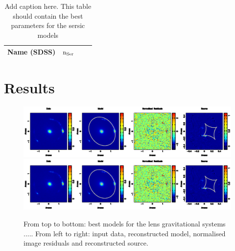 \documentclass[a4paper,fleqn,usenatbib]{mnras}
\begin{document}
\begin{table}
\caption{Add caption here. This table should contain the best parameters for the sersic models}
\begin{tabular}{cccc}
\hline
 Name (SDSS) &$\rm{n_{Ser}}$\\
 \hline

 \hline
\end{tabular}
\label{tbl:sersic} 
\end{table}

\section{Results}
%

\begin{figure}
\begin{center} 
\includegraphics[width = 16 cm]{fig1a.ps}
\includegraphics[width = 16 cm]{fig1a.ps}
\caption{From top to bottom: best models for the lens gravitational systems ..... From left to right: input data, reconstructed model, normalised image residuals and reconstructed source.}
\label{fig:J0252_smooth}
\end{center}     
 \end{figure}
\end{document}
